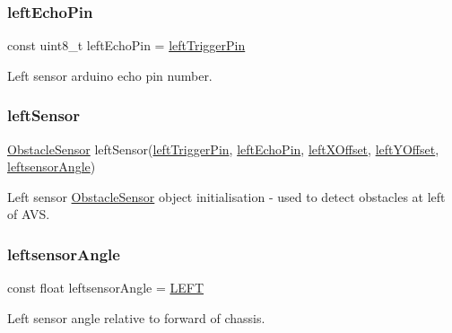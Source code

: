 \subsubsection{\texorpdfstring{left\+Echo\+Pin}{leftEchoPin}}
{\footnotesize\ttfamily const uint8\+\_\+t left\+Echo\+Pin = \mbox{\hyperlink{bot_main_8ino_a297d5238270dc0d92e1a65b016a79f2e}{left\+Trigger\+Pin}}}



Left sensor arduino echo pin number. 

\mbox{\label{bot_main_8ino_af137d1119f05ab98ae8e50559b9d6bfe}} 
\subsubsection{\texorpdfstring{left\+Sensor}{leftSensor}}
{\footnotesize\ttfamily \mbox{\hyperlink{class_obstacle_sensor}{Obstacle\+Sensor}} left\+Sensor(\mbox{\hyperlink{bot_main_8ino_a297d5238270dc0d92e1a65b016a79f2e}{left\+Trigger\+Pin}}, \mbox{\hyperlink{bot_main_8ino_a203479aa2174a6eedd63da361e6e302c}{left\+Echo\+Pin}}, \mbox{\hyperlink{bot_main_8ino_a2d121af61e2977de12f5bfbbe8559dca}{left\+X\+Offset}}, \mbox{\hyperlink{bot_main_8ino_a7be9826e4f54e376321bcdea4177a8ed}{left\+Y\+Offset}}, \mbox{\hyperlink{bot_main_8ino_a8be5324bad65fa0bad41e0c70066a958}{leftsensor\+Angle}})}



Left sensor \mbox{\hyperlink{class_obstacle_sensor}{Obstacle\+Sensor}} object initialisation -\/ used to detect obstacles at left of A\+VS. 

\mbox{\label{bot_main_8ino_a8be5324bad65fa0bad41e0c70066a958}} 
\subsubsection{\texorpdfstring{leftsensor\+Angle}{leftsensorAngle}}
{\footnotesize\ttfamily const float leftsensor\+Angle = \mbox{\hyperlink{bot_main_8ino_a437ef08681e7210d6678427030446a54}{L\+E\+FT}}}



Left sensor angle relative to forward of chassis. 

